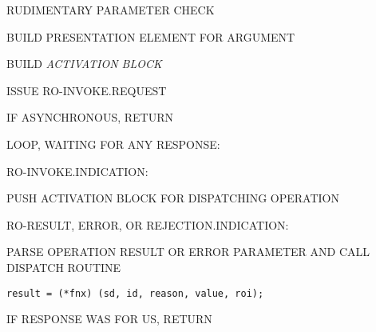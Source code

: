 \begin{bwslide}

\begin{nrtc}
\item	RUDIMENTARY PARAMETER CHECK

\item	BUILD PRESENTATION ELEMENT FOR ARGUMENT

\item	BUILD \emph{ACTIVATION BLOCK}

\item	ISSUE RO-INVOKE.REQUEST

\item	IF ASYNCHRONOUS, RETURN

\item	LOOP, WAITING FOR ANY RESPONSE:
    \begin{nrtc}
    \item	RO-INVOKE.INDICATION:
	\begin{nrtc}
	\item	 PUSH ACTIVATION BLOCK FOR DISPATCHING OPERATION
	\end{nrtc}

    \item	RO-RESULT, ERROR, OR REJECTION.INDICATION:
	\begin{nrtc}
	\item	PARSE OPERATION RESULT OR ERROR PARAMETER AND CALL DISPATCH
		ROUTINE
\begin{verbatim}
result = (*fnx) (sd, id, reason, value, roi);
\end{verbatim}

	\item	IF RESPONSE WAS FOR US, RETURN
	\end{nrtc}
    \end{nrtc}
\end{nrtc}
\end{bwslide}



